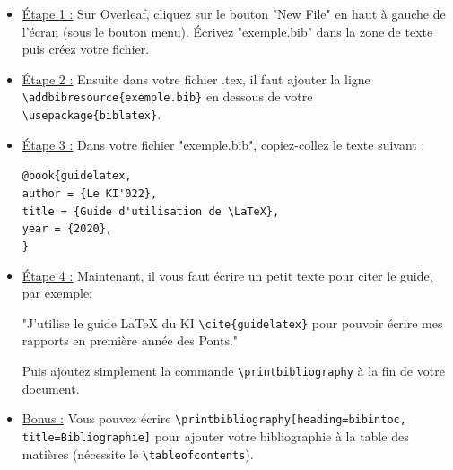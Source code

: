 \documentclass[11pt]{article}				%
\newcommand{\cmd}[2]{\texttt{\textbackslash #1}\texttt{\{#2\}}}
\begin{document}
\begin{itemize}
	\item \underline{Étape 1 :} Sur Overleaf, cliquez sur le bouton "New File" en haut à gauche de l'écran (sous le bouton menu). Écrivez "exemple.bib" dans la zone de texte puis créez votre fichier.\\
	
	\item \underline{Étape 2 :} Ensuite dans votre fichier .tex, il faut ajouter la ligne \cmd{addbibresource}{exemple.bib} en dessous de votre \cmd{usepackage}{biblatex}.\\
	
	\item \underline{Étape 3 :} Dans votre fichier "exemple.bib", copiez-collez le texte suivant :
	\begin{flushleft}
		\verb|@book{guidelatex,| \\
		\qquad	\verb|author = {Le KI'022},| \\
		\qquad	\verb|title = {Guide d'utilisation de \LaTeX},| \\
		\qquad   \verb|year = {2020},| \\
		\verb|}| \\
		
	\end{flushleft}
	
	\item \underline{Étape 4 :} Maintenant, il vous faut écrire un petit texte pour citer le guide, par exemple:
	
	"J'utilise le guide LaTeX du KI \cmd{cite}{guidelatex} pour pouvoir écrire mes rapports en première année des Ponts."
	
	Puis ajoutez simplement la commande \verb|\printbibliography| à la fin de votre document.\\
	
	\item \underline{Bonus :} Vous pouvez écrire \verb|\printbibliography[heading=bibintoc, title=Bibliographie]| pour ajouter votre bibliographie à la table des matières (nécessite le \verb|\tableofcontents|).
	
\end{itemize}
\end{document}
